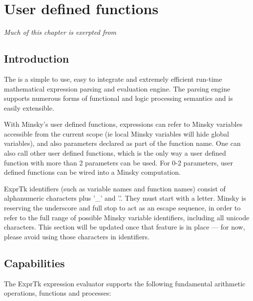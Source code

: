 \chapter{User defined functions}

{\em Much of this chapter is exerpted from }

\section{Introduction}
The  is  a simple
to  use,   easy  to   integrate  and   extremely  efficient   run-time
mathematical  expression parsing  and evaluation  engine. The  parsing
engine  supports numerous  forms  of  functional and  logic processing
semantics and is easily extensible.

With Minsky's user defined functions, expressions can refer to Minsky
variables accessible from the current scope (ie local Minsky variables
will hide global variables), and also parameters declared as part of
the function name. One can also call other user defined functions,
which is the only way a user defined function with more than 2
parameters can be used. For 0-2 parameters, user defined functions can
be wired into a Minsky computation.

ExprTk identifiers (such as variable names and function names) consist
of alphanumeric characters plus '\_' and '.'. They must start with a
letter. Minsky is reserving the underscore and full stop to act as an
escape sequence, in order to refer to the full range of possible
Minsky variable identifiers, including all unicode characters. This
section will be updated once that feature is in place --- for now,
please avoid using those characters in identifiers.

\section{Capabilities}
The  ExprTk expression  evaluator supports  the following  fundamental
arithmetic operations, functions and processes:

